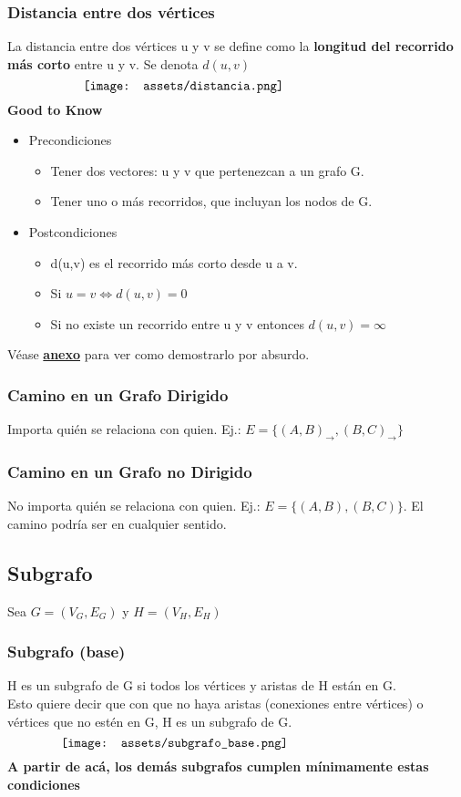 \documentclass[10pt,a4paper]{article}
\begin{document}
\subsubsection*{Distancia entre dos vértices}
La distancia entre dos vértices u y v se define como la \textbf{longitud del recorrido más corto} entre u y v. Se denota $d(u,v)$ 
\[\begin{minipage}[b]{0.7\textwidth}
    \texttt{[image: assets/distancia.png]}
\end{minipage}\]
\textbf{Good to Know} 
\begin{itemize}
    \item Precondiciones
    \begin{itemize}
        \item Tener dos vectores: u y v que pertenezcan a un grafo G.
        \item Tener uno o más recorridos, que incluyan los nodos de G.
    \end{itemize}
    \item Postcondiciones
    \begin{itemize}
        \item d(u,v) es el recorrido más corto desde u a v.
        \item Si $u=v \iff d(u,v) = 0$
        \item Si no existe un recorrido entre u y v entonces $d(u,v) = \infty$
    \end{itemize}
\end{itemize}
Véase \hyperref[subsubsec:distancia_demostracion]{\textbf{anexo}} para ver como demostrarlo por absurdo.
\subsubsection*{Camino en un Grafo Dirigido}
Importa quién se relaciona con quien. Ej.: $E = \{(A, B)_{\rightarrow}, (B, C)_{\rightarrow}\}$
\subsubsection*{Camino en un Grafo no Dirigido}
No importa quién se relaciona con quien. Ej.: $E = \{(A, B), (B, C)\}$. El camino podría ser en cualquier sentido. 
\subsection*{Subgrafo}
Sea $G = (V_{G}, E_{G})$ y $H = (V_{H}, E_{H})$ 
\subsubsection*{Subgrafo (base)}
H es un subgrafo de G si todos los vértices y aristas de H están en G. \\
Esto quiere decir que con que no haya aristas (conexiones entre vértices) o vértices que no estén en G, H es un subgrafo de G.
\[\begin{minipage}[b]{0.8\textwidth}
    \texttt{[image: assets/subgrafo\_base.png]}
\end{minipage}\]
\textbf{A partir de acá, los demás subgrafos cumplen mínimamente estas condiciones}
\end{document}
